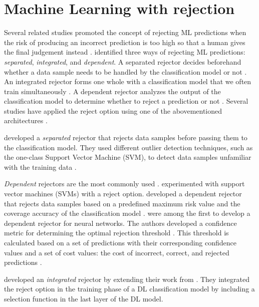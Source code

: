 \section{Machine Learning with rejection}
\label{sec:related-work-rejection}
Several related studies promoted the concept of rejecting ML predictions when the risk of producing an incorrect prediction is too high so that a human gives the final judgement instead \citep{sayin2021science, hendrickx2021machine, woo2020future}.
%
\citet{hendrickx2021machine} identified three ways of rejecting ML predictions: \emph{separated}, \emph{integrated}, and \emph{dependent}.
%
A separated rejector decides beforehand whether a data sample needs to be handled by the classification model or not \citep{hendrickx2021machine}.
%
An integrated rejector forms one whole with a classification model that we often train simultaneously \citep{hendrickx2021machine}.
%
A dependent rejector analyzes the output of the classification model to determine whether to reject a prediction or not \citep{hendrickx2021machine}.
%
Several studies have applied the reject option using one of the abovementioned architectures \citep{coenen2020probability, grandvalet2008reject, Geifman2017Selective, geifman2019reject, de2000reject}.
%

%
\citet{coenen2020probability} developed a \emph{separated} rejector that rejects data samples before passing them to the classification model.
%
They used different outlier detection techniques, such as the one-class Support Vector Machine (SVM), to detect data samples unfamiliar with the training data \citep{coenen2020probability}.
%

%
\emph{Dependent} rejectors are the most commonly used \citep{Geifman2017Selective, de2000reject, grandvalet2008reject}.
%
\citet{grandvalet2008reject} experimented with support vector machines (SVMs) with a reject option.
%
\citet{Geifman2017Selective} developed a dependent rejector that rejects data samples based on a predefined maximum risk value and the coverage accuracy of the classification model \citep{Geifman2017Selective}.
%
\citet{de2000reject} were among the first to develop a dependent rejector for neural networks.
%
The authors developed a confidence metric for determining the optimal rejection threshold \citep{de2000reject}.
%
This threshold is calculated based on a set of predictions with their corresponding confidence values and a set of cost values: the cost of incorrect, correct, and rejected predictions \citep{de2000reject}.
%

%
\citet{geifman2019reject} developed an \emph{integrated} rejector by extending their work from \citet{Geifman2017Selective}.
%
They integrated the reject option in the training phase of a DL classification model by including a selection function in the last layer of the DL model.
%


